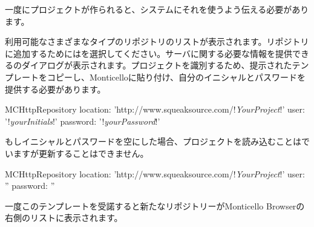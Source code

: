\documentclass[a4paper,10pt,twoside]{book}
\begin{document}
一度\sqsrc にプロジェクトが作られると、\pharo システムにそれを使うよう伝える必要があります。

  利用可能なさまざまなタイプのリポジトリのリストが表示されます。\sqsrc リポジトリに追加するためにはを選択してください。サーバに関する必要な情報を提供できるのダイアログが表示されます。\sqsrc プロジェクトを識別するため、提示されたテンプレートをコピーし、Monticelloに貼り付け、自分のイニシャルとパスワードを提供する必要があります。 

\begin{code}{}
MCHttpRepository 
    location: 'http://www.squeaksource.com/!\emph{YourProject}!'
    user: '!\emph{yourInitials}!' 
    password: '!\emph{yourPassword}!'
\end{code}   

\noindent
もしイニシャルとパスワードを空にした場合、プロジェクトを読み込むことはでいますが更新することはできません。

\begin{code}{}
MCHttpRepository 
    location: 'http://www.squeaksource.com/!\emph{YourProject}!'
    user: '' 
    password: ''
\end{code}   

一度このテンプレートを受諾すると新たなリポジトリーがMonticello Browserの右側のリストに表示されます。
\end{document}
